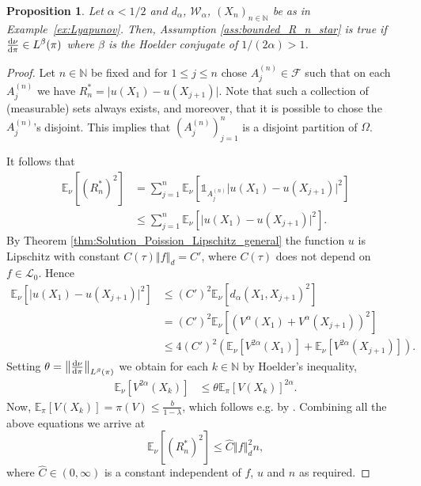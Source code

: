 \documentclass[12pt]{article}
\theoremstyle{plain}
\newtheorem{prop}[thm]{Proposition}
\renewcommand{\d}{{\rm d}}
\newcommand{\norm}[1]{\left\Vert #1 \right\Vert}
\newcommand{\N}{\mathbb{N}}
\newcommand{\E}{\mathbb{E}}
\begin{document}
{\begin{prop}\label{prop:growth_assumption_Lyapunov}
Let $\alpha<1/2$ and $d_\alpha$, $\mathcal{W}_\alpha$, $(X_n)_{n \in \N}$ be as in Example~\ref{ex:Lyapunov}.
Then, Assumption \ref{ass:bounded_R_n_star} is true if $\frac{\d \nu}{\d \pi} \in L^{\beta}(\pi)$ where $\beta$ is the Hoelder conjugate of $1/(2\alpha) >1$.
\end{prop}

\begin{proof}
Let $n \in \N$ be fixed and for $1 \leq j \leq n$ chose $A_j^{(n)} \in \mathcal{F}$ such that on each $A_j^{(n)}$ we have $R_n^* = \vert u(X_1) - u(X_{j+1}) \vert$. 
Note that such a collection of (measurable) sets always exists, and moreover, that it is possible to chose the $A_j^{(n)}$'s disjoint. This implies that $(A_j^{(n)})_{j =1}^n$ is a disjoint partition of $\Omega$. 

It follows that 
\begin{align*}
\E_\nu\left[(R_n^*)^2\right] &= \sum_{j=1}^n \E_\nu\left[ \mathds{1}_{A_j^{(n)}} \vert u(X_1) - u(X_{j+1})\vert^2  \right] \\
&\leq 
\sum_{j=1}^n \E_\nu\left[ \vert u(X_1) - u(X_{j+1})\vert^{2}  \right].
\end{align*}
By Theorem \ref{thm:Solution_Poission_Lipschitz_general} the function $u$ is Lipschitz with constant $C(\tau) \norm{f}_d = {C'}$, where $C(\tau)$ does not depend on $f \in \mathscr{L}_0$. Hence
\begin{align*}
\E_\nu\left[ \vert u(X_1) - u(X_{j+1})\vert^{2}  \right] & \leq (C')^2 \E_\nu[d_\alpha(X_1, X_{j+1})^{2}] \\ 
&= 
(C')^2 \E_\nu[(V^{\alpha}(X_1) + V^{\alpha} (X_{j+1}))^{2}] \\
&\leq 
4(C')^2 \left( \E_\nu[V^{2\alpha}(X_1)] + \E_\nu[ V^{2\alpha} (X_{j+1})]\right) .
\end{align*}
Setting $\theta= \norm{\frac{\d \nu}{\d \pi}}_{L^{\beta}(\pi)}$ we obtain for each $k \in \N$ by Hoelder's inequality,
\begin{align*}
\E_\nu[V^{2\alpha}(X_k)] &\leq \theta \E_\pi[ V (X_{k})]^{2\alpha}.
\end{align*}
Now, $\E_\pi[V(X_k)] = \pi(V) \leq \frac{b}{1-\lambda}$, which follows e.g. by \cite[Proposition 4.24]{hairer2006ergodic}.
Combining all the above equations we arrive at 
\[
\E_\nu\left[(R_n^*)^2\right] \leq \widehat{C} \norm{f}_d^2 n, 
\]
where $\widehat{C} \in (0, \infty)$ is a constant independent of $f$, $u$ and $n$ as required. 
\end{proof}

}
\end{document}
